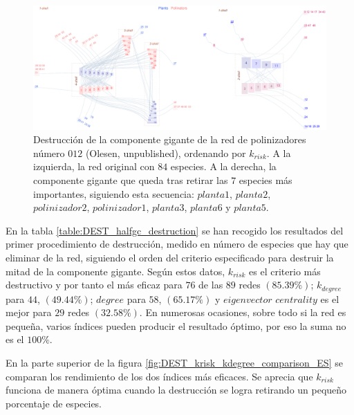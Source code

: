 \begin{figure}[h!]
\centering
\includegraphics[scale=0.25]{Figures/DEST_M_PL_012_ziggurat_hf_destruction.eps}
\caption {Destrucción de la componente gigante de la red de polinizadores número $012$ (Olesen, unpublished), ordenando por $k_{risk}$. A la izquierda, la red original con $84$ especies. A la derecha, la componente gigante que queda tras retirar las $7$ especies más importantes, siguiendo esta secuencia: $planta1$, $planta2$, $polinizador2$, $polinizador1$, $planta3$, $planta6$ y $planta5$.}
\label{fig:DEST_M_PL_012_ziggurat_hf_destruction}
\end{figure}

En la tabla \ref{table:DEST_halfgc_destruction} se han recogido los resultados del primer procedimiento de destrucción, medido en número de especies que hay que eliminar de la red, siguiendo el orden del criterio especificado para destruir la mitad de la componente gigante. Según estos datos, $k_{risk}$ es el criterio más destructivo y por tanto el más eficaz para $76$ de las $89$ redes $(85.39\%)$; $k_{degree}$ para $44$, $(49.44\%)$; $degree$ para $58$, $(65.17\%)$ y
$eigenvector$ $centrality$ es el mejor para $29$ redes $(32.58\%)$. En numerosas ocasiones, sobre todo si la red es pequeña, varios índices pueden producir el
resultado óptimo, por eso la suma no es el $100\%$.

En la parte superior de la figura \ref{fig:DEST_krisk_kdegree_comparison_ES} se comparan los rendimiento de los dos índices más eficaces. Se aprecia que ${k}_{risk}$ funciona de manera óptima cuando la destrucción se logra retirando un pequeño porcentaje de especies.

